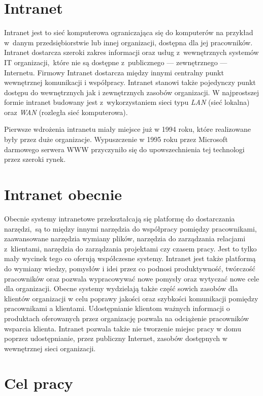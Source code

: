 \section{Intranet}
Intranet jest to sieć komputerowa ograniczająca się do komputerów na przykład w~danym przedsiębiorstwie lub innej organizacji, dostępna dla jej pracowników. Intranet dostarcza szeroki zakres informacji oraz usług z~wewnętrznych systemów IT organizacji,~które nie są dostępne z~publicznego --- zewnętrznego --- Internetu. Firmowy Intranet dostarcza między innymi centralny punkt wewnętrznej komunikacji i współpracy. Intranet stanowi także pojedynczy punkt dostępu do wewnętrznych jak i zewnętrznych zasobów organizacji. W najprostszej formie intranet budowany jest z~wykorzystaniem sieci typu \emph{LAN} (sieć lokalna) oraz \emph{WAN} (rozległa sieć komputerowa)\cite{intranetWiki}.

Pierwsze wdrożenia intranetu miały miejsce już w 1994 roku, które realizowane były przez duże organizacje. Wypuszczenie w 1995 roku przez Microsoft darmowego serwera WWW przyczyniło się do upowszechnienia tej technologi przez szeroki rynek.

\section{Intranet obecnie}
Obecnie systemy intranetowe przekształcają się platformę do dostarczania narzędzi,~są to między innymi narzędzia do współpracy pomiędzy pracownikami, zaawansowane narzędzia wymiany plików, narzędzia do zarządzania relacjami z~klientami, narzędzia do zarządzania projektami czy czasem pracy. Jest to tylko mały wycinek tego co oferują współczesne systemy. Intranet jest także platformą do wymiany wiedzy, pomysłów i idei przez co podnosi produktywność, twórczość pracowników oraz pozwala wypracowywać nowe pomysły oraz wytyczać nowe cele dla organizacji. Obecne systemy wydzielają także część sowich zasobów dla klientów organizacji w celu poprawy jakości oraz szybkości komunikacji pomiędzy pracownikami a klientami. Udostępnianie klientom ważnych informacji o produktach oferowanych przez organizację pozwala na odciążenie pracowników wsparcia klienta. Intranet pozwala także nie tworzenie miejsc pracy w domu poprzez udostępnianie, przez publiczny Internet, zasobów dostępnych w wewnętrznej sieci organizacji. 

\section{Cel pracy}

